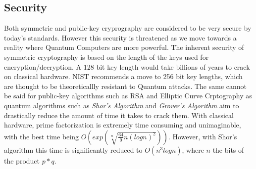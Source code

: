 \documentclass[journal]{IEEEtran}
\begin{document}
\subsection{Security}
Both symmetric and public-key cryprography are considered to be very secure by today's standards. However this security is threatened as we move towards a reality where Quantum Computers 
are more powerful. The inherent security of symmetric cryptography is based on the length of the keys used for encryption/decryption. A 128 bit key length would take billions of years
to crack on classical hardware. NIST recommends a move to 256 bit key lengths, which are thought to be theoreticallly resistant to Quantum attacks. The same cannot be said for public-key algorithms such as RSA and Elliptic Curve 
Crptography as quantum algorithms such as \emph{Shor's Algorithm} and \emph{Grover's Algorithm} aim to drastically reduce the amount of time it takes to crack them. With classical hardware, prime factorization is extremely time consuming and
unimaginable, with the best time being $O(exp(\sqrt[n]{\frac{64}{9}n(logn)^2}))$. However, with Shor's algorithm this time is significantly reduced to $O(n^3logn)$, where $n$ the bits of the product $p*q$.
\end{document}
